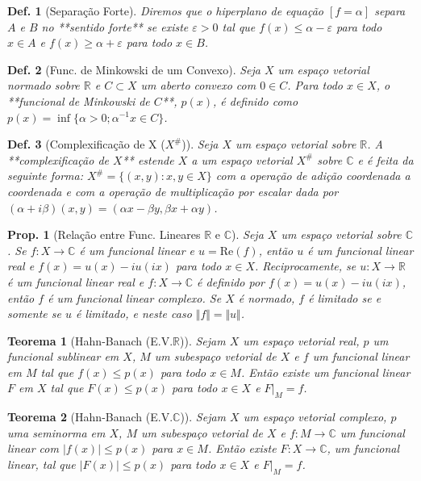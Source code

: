 \documentclass[11pt]{article}
\theoremstyle{yellowhead}
\newtheorem*{theorem}{Teorema}
\newtheorem*{proposition}{Prop.}
\theoremstyle{yellowdef}
\newtheorem*{definition}{Def.}
\begin{document}
\begin{multicols}{3}
\begin{definition}[Separação Forte]
Diremos que o hiperplano de equação $[f = \alpha]$ separa $A$ e $B$ no **sentido forte** se existe $\varepsilon > 0$ tal que $f(x) \le \alpha - \varepsilon$ para todo $x \in A$ e $f(x) \ge \alpha + \varepsilon$ para todo $x \in B$.
\end{definition}

\begin{definition}[Func. de Minkowski de um Convexo]
Seja $X$ um espaço vetorial normado sobre $\mathbb{R}$ e $C \subset X$ um aberto convexo com $0 \in C$. Para todo $x \in X$, o **funcional de Minkowski de $C$**, $p(x)$, é definido como $p(x) = \inf\{\alpha > 0 ; \alpha^{-1}x \in C\}$.
\end{definition}

\begin{definition}[Complexificação de X ($X^{\#}$)]
Seja $X$ um espaço vetorial sobre $\mathbb{R}$. A **complexificação de $X$** estende $X$ a um espaço vetorial $X^{\#}$ sobre $\mathbb{C}$ e é feita da seguinte forma: $X^{\#} = \{(x, y) : x, y \in X\}$ com a operação de adição coordenada a coordenada e com a operação de multiplicação por escalar dada por $(\alpha + i\beta)(x, y) = (\alpha x - \beta y, \beta x + \alpha y)$.
\end{definition}
\begin{proposition}[Relação entre Func. Lineares $\mathbb{R}$ e $\mathbb{C}$]
Seja $X$ um espaço vetorial sobre $\mathbb{C}$. Se $f: X \to \mathbb{C}$ é um funcional linear e $u = \text{Re}(f)$, então $u$ é um funcional linear real e $f(x) = u(x) - iu(ix)$ para todo $x \in X$.
Reciprocamente, se $u: X \to \mathbb{R}$ é um funcional linear real e $f: X \to \mathbb{C}$ é definido por $f(x) = u(x) - iu(ix)$, então $f$ é um funcional linear complexo. Se $X$ é normado, $f$ é limitado se e somente se $u$ é limitado, e neste caso $\Vert f \Vert = \Vert u \Vert$.
\end{proposition}

\begin{theorem}[Hahn-Banach (E.V.$\mathbb{R}$)]
Sejam $X$ um espaço vetorial real, $p$ um funcional sublinear em $X$, $M$ um subespaço vetorial de $X$ e $f$ um funcional linear em $M$ tal que $f(x) \le p(x)$ para todo $x \in M$. Então existe um funcional linear $F$ em $X$ tal que $F(x) \le p(x)$ para todo $x \in X$ e $F|_M = f$.
\end{theorem}

\begin{theorem}[Hahn-Banach (E.V.$\mathbb{C}$)]
Sejam $X$ um espaço vetorial complexo, $p$ uma seminorma em $X$, $M$ um subespaço vetorial de $X$ e $f: M \to \mathbb{C}$ um funcional linear com $|f(x)| \le p(x)$ para $x \in M$.
Então existe $F: X \to \mathbb{C}$, um funcional linear, tal que $|F(x)| \le p(x)$ para todo $x \in X$ e $F|_M = f$.
\end{theorem}


\end{multicols}
\end{document}
